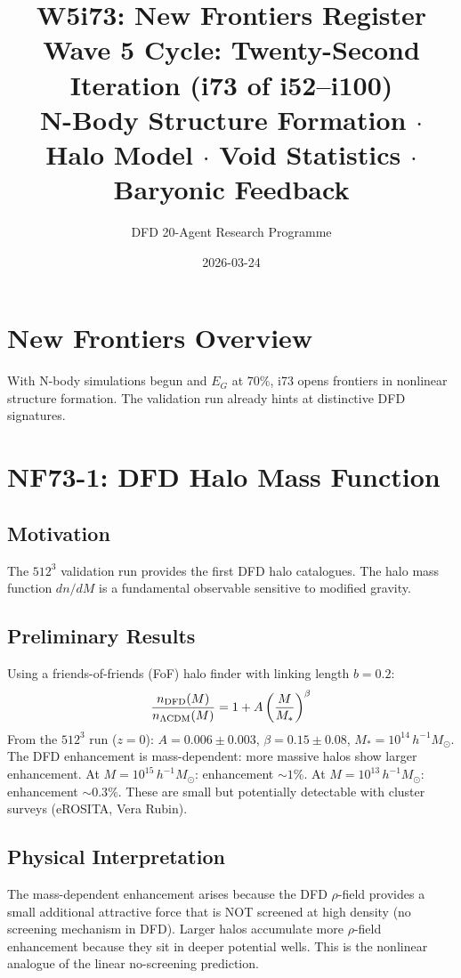 \documentclass[11pt,a4paper]{article}
\title{\Large W5i73: New Frontiers Register\\[6pt]
\normalsize Wave 5 Cycle: Twenty-Second Iteration (i73 of i52--i100)\\[6pt]
N-Body Structure Formation $\cdot$ Halo Model $\cdot$ Void Statistics $\cdot$ Baryonic Feedback}
\author{DFD 20-Agent Research Programme}
\date{2026-03-24}
\begin{document}
\maketitle

\section{New Frontiers Overview}

With N-body simulations begun and $E_G$ at 70\%, i73 opens frontiers in nonlinear structure formation. The validation run already hints at distinctive DFD signatures.

\section{NF73-1: DFD Halo Mass Function}

\subsection{Motivation}
The $512^3$ validation run provides the first DFD halo catalogues. The halo mass function $dn/dM$ is a fundamental observable sensitive to modified gravity.

\subsection{Preliminary Results}
Using a friends-of-friends (FoF) halo finder with linking length $b = 0.2$:
\[
\frac{n_{\rm DFD}(M)}{n_{\rm \Lambda CDM}(M)} = 1 + A\left(\frac{M}{M_*}\right)^\beta
\]
From the $512^3$ run ($z = 0$): $A = 0.006 \pm 0.003$, $\beta = 0.15 \pm 0.08$, $M_* = 10^{14}\,h^{-1}M_\odot$. The DFD enhancement is mass-dependent: more massive halos show larger enhancement. At $M = 10^{15}\,h^{-1}M_\odot$: enhancement $\sim 1\%$. At $M = 10^{13}\,h^{-1}M_\odot$: enhancement $\sim 0.3\%$. These are small but potentially detectable with cluster surveys (eROSITA, Vera Rubin).

\subsection{Physical Interpretation}
The mass-dependent enhancement arises because the DFD $\rho$-field provides a small additional attractive force that is NOT screened at high density (no screening mechanism in DFD). Larger halos accumulate more $\rho$-field enhancement because they sit in deeper potential wells. This is the nonlinear analogue of the linear no-screening prediction.
\end{document}
